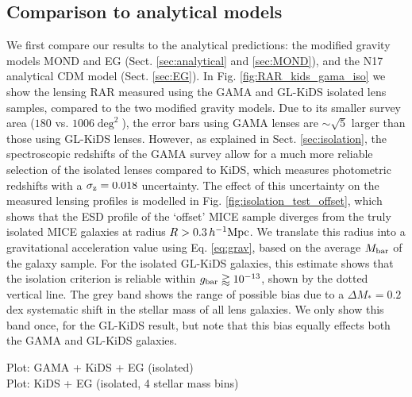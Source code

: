 \documentclass[usenatbib]{mnras}
\newcommand{\hMpc}{\, h^{-1}{\rm{Mpc}} }
\newcommand{\un}[1]{_{\rm #1}}
\begin{document}
\subsection{Comparison to analytical models}

We first compare our results to the analytical predictions: the modified gravity models MOND and EG (Sect. \ref{sec:analytical} and \ref{sec:MOND}), and the N17 analytical CDM model (Sect. \ref{sec:EG}). In Fig. \ref{fig:RAR_kids_gama_iso} we show the lensing RAR measured using the GAMA and GL-KiDS isolated lens samples, compared to the two modified gravity models. Due to its smaller survey area ($180$ vs. $1006 \deg^2$), the error bars using GAMA lenses are $\sim\sqrt{5}$ larger than those using GL-KiDS lenses. However, as explained in Sect. \ref{sec:isolation}, the spectroscopic redshifts of the GAMA survey allow for a much more reliable selection of the isolated lenses compared to KiDS, which measures photometric redshifts with a $\sigma\un{z}=0.018$ uncertainty. The effect of this uncertainty on the measured lensing profiles is modelled in Fig. \ref{fig:isolation_test_offset}, which shows that the ESD profile of the `offset' MICE sample diverges from the truly isolated MICE galaxies at radius $R > 0.3 \hMpc$. We translate this radius into a gravitational acceleration value using Eq. \ref{eq:grav}, based on the average $M\un{bar}$ of the galaxy sample. For the isolated GL-KiDS galaxies, this estimate shows that the isolation criterion is reliable within $g\un{bar} \gtrapprox 10^{-13}$, shown by the dotted vertical line. The grey band shows the range of possible bias due to a $\Delta M_*=0.2$ dex systematic shift in the stellar mass of all lens galaxies. We only show this band once, for the GL-KiDS result, but note that this bias equally effects both the GAMA and GL-KiDS galaxies. 


Plot: GAMA + KiDS + EG (isolated) \\
Plot: KiDS + EG (isolated, 4 stellar mass bins)
\end{document}
